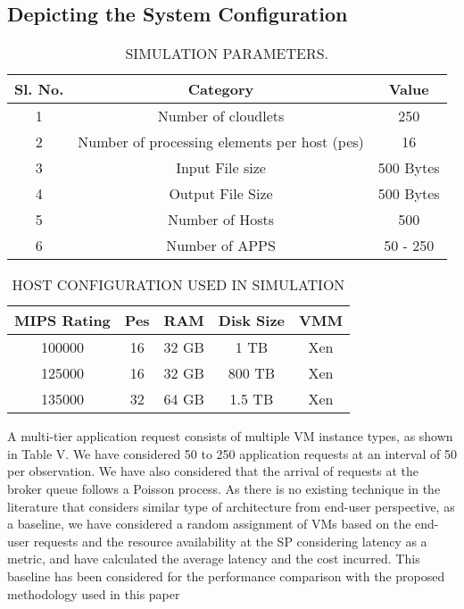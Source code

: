 \documentclass[12pt,a4paper,twoside,openright]{report}
\newcommand\tab[1][0.8cm]{\hspace*{#1}}
\begin{document}
\subsection{Depicting the System Configuration}

\begin{table}[htbp!]
	\caption{SIMULATION PARAMETERS.}
	\begin{center}
		\begin{tabular}{|c|c|c|}
			\hline
			Sl. No. & Category & Value\\
			\hline
			1 & Number of cloudlets& 250 \\
			\hline
			2 & Number of processing elements per host (pes) & 16\\
			\hline
			3 & Input File size & 500 Bytes \\
			\hline
			4 & Output File Size & 500 Bytes \\
			
			\hline
			5 & Number of Hosts & 500  \\
			\hline
			6 & Number of APPS & 50 - 250 \\
			\hline
			
		\end{tabular}
		\label{tab1}
	\end{center}
\end{table}

\begin{table}[htbp!]
	\caption{HOST CONFIGURATION USED IN SIMULATION}
	\begin{center}
		\begin{tabular}{|c|c|c|c|c|}
			\hline
			MIPS Rating & Pes & RAM & Disk Size & VMM\\
			\hline
			100000 & 16 & 32 GB & 1 TB & Xen \\
			\hline
			125000 & 16 & 32 GB & 800 TB & Xen\\
			\hline
			135000 & 32 & 64 GB & 1.5 TB & Xen \\
			\hline
		\end{tabular}
		\label{tab1}
	\end{center}
\end{table}
\tab A multi-tier
application request consists of multiple VM instance types, as
shown in Table V. We have considered 50 to 250 application
requests at an interval of 50 per observation. We have also
considered that the arrival of requests at the broker queue
follows a Poisson process. As there is no existing technique
in the literature that considers similar type of architecture
from end-user perspective, as a baseline, we have considered
a random assignment of VMs based on the end-user requests
and the resource availability at the SP considering latency
as a metric, and have calculated the average latency and
the cost incurred. This baseline has been considered for the
performance comparison with the proposed methodology used
in this paper
\end{document}
